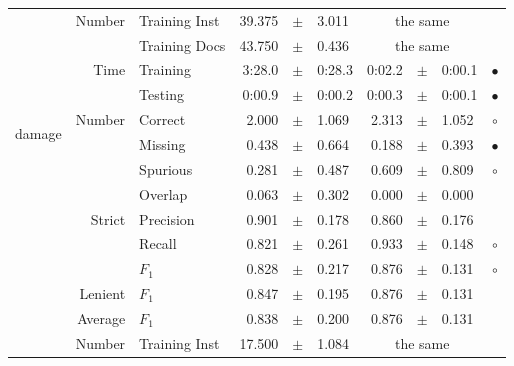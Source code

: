 \begin{longtable}{|r|r|l||rcl|rcl|c|}
\cline{2-10} & \multirow{2}{*}{    Number} &   Training Inst &      39.375 &  $\pm$  &       3.011 &    \multicolumn{3}{c|}{the same}         &  \\
\cline{3-10} &                             &   Training Docs &      43.750 &  $\pm$  &       0.436 &    \multicolumn{3}{c|}{the same}         &  \\
\cline{2-10} & \multirow{2}{*}{      Time} &        Training &      3:28.0 &  $\pm$  &      0:28.3 &      0:02.2 &  $\pm$  &      0:00.1 & $\bullet$ \\
\cline{3-10} &                             &         Testing &      0:00.9 &  $\pm$  &      0:00.2 &      0:00.3 &  $\pm$  &      0:00.1 & $\bullet$ \\
\hline
\hline
\multirow{11}{*}{\begin{sideways}damage\end{sideways} }
             & \multirow{4}{*}{    Number} &         Correct &       2.000 &  $\pm$  &       1.069 &       2.313 &  $\pm$  &       1.052 & $\circ$ \\
\cline{3-10} &                             &         Missing &       0.438 &  $\pm$  &       0.664 &       0.188 &  $\pm$  &       0.393 & $\bullet$ \\
\cline{3-10} &                             &        Spurious &       0.281 &  $\pm$  &       0.487 &       0.609 &  $\pm$  &       0.809 & $\circ$ \\
\cline{3-10} &                             &         Overlap &       0.063 &  $\pm$  &       0.302 &       0.000 &  $\pm$  &       0.000 &  \\
\cline{2-10} & \multirow{3}{*}{    Strict} &       Precision &       0.901 &  $\pm$  &       0.178 &       0.860 &  $\pm$  &       0.176 &  \\
\cline{3-10} &                             &          Recall &       0.821 &  $\pm$  &       0.261 &       0.933 &  $\pm$  &       0.148 & $\circ$ \\
\cline{3-10} &                             &           $F_1$ &       0.828 &  $\pm$  &       0.217 &       0.876 &  $\pm$  &       0.131 & $\circ$ \\
\cline{2-10} &                     Lenient &           $F_1$ &       0.847 &  $\pm$  &       0.195 &       0.876 &  $\pm$  &       0.131 &  \\
\cline{2-10} &                     Average &           $F_1$ &       0.838 &  $\pm$  &       0.200 &       0.876 &  $\pm$  &       0.131 &  \\
\cline{2-10} & \multirow{2}{*}{    Number} &   Training Inst &      17.500 &  $\pm$  &       1.084 &    \multicolumn{3}{c|}{the same}         &  \\

\end{longtable}
